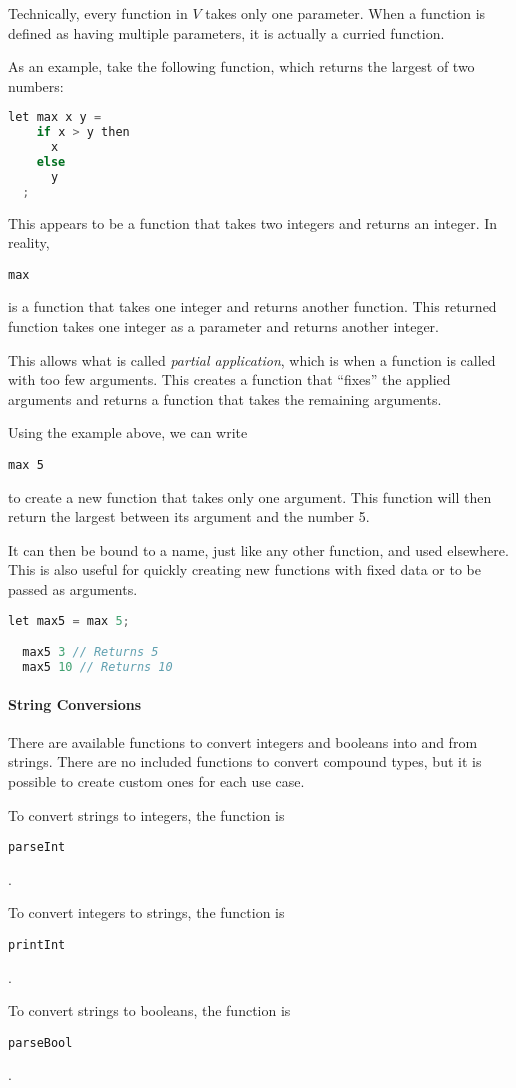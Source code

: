 \documentclass{article}
\def\code#1{\begin{footnotesize}\texttt{#1}\end{footnotesize}}
\begin{document}
Technically, every function in $V$ takes only one parameter.
When a function is defined as having multiple parameters, it is actually a curried function.

As an example, take the following function, which returns the largest of two numbers:

\begin{lstlisting}[language=V]
  let max x y =
    if x > y then
      x
    else
      y
  ;
\end{lstlisting}

This appears to be a function that takes two integers and returns an integer.
In reality, \code{max} is a function that takes one integer and returns another function.
This returned function takes one integer as a parameter and returns another integer.

This allows what is called \emph{partial application}, which is when a function is called with too few arguments.
This creates a function that ``fixes'' the applied arguments and returns a function that takes the remaining arguments.

Using the example above, we can write \code{max 5} to create a new function that takes only one argument.
This function will then return the largest between its argument and the number 5.

It can then be bound to a name, just like any other function, and used elsewhere.
This is also useful for quickly creating new functions with fixed data or to be passed as arguments.

\begin{lstlisting}[language=V]
  let max5 = max 5;

  max5 3 // Returns 5
  max5 10 // Returns 10
\end{lstlisting}

\paragraph{String Conversions}

There are available functions to convert integers and booleans into and from strings.
There are no included functions to convert compound types, but it is possible to create custom ones for each use case.

To convert strings to integers, the function is \code{parseInt}.

To convert integers to strings, the function is \code{printInt}.

To convert strings to booleans, the function is \code{parseBool}.
\end{document}
